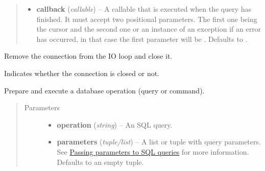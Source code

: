 \documentclass[letterpaper,10pt,english]{sphinxmanual}
\begin{document}
\begin{fulllineitems}
\begin{fulllineitems}
\begin{quote}
\begin{description}
\begin{itemize}
\item {} 
\textbf{callback} (\emph{callable}) -- A callable that is executed when the query has finished. It must accept
two positional parameters. The first one being the cursor and the second
one  or an instance of an exception if an error has occurred,
in that case the first parameter will be . Defaults to .

\end{itemize}

\end{description}\end{quote}

\end{fulllineitems}


\begin{fulllineitems}
\label{api:momoko.Connection.close}
Remove the connection from the IO loop and close it.

\end{fulllineitems}


\begin{fulllineitems}
\label{api:momoko.Connection.closed}
Indicates whether the connection is closed or not.

\end{fulllineitems}


\begin{fulllineitems}
\label{api:momoko.Connection.execute}
Prepare and execute a database operation (query or command).
\begin{quote}\begin{description}
\item[{Parameters}] \leavevmode\begin{itemize}
\item {} 
\textbf{operation} (\emph{string}) -- An SQL query.

\item {} 
\textbf{parameters} (\emph{tuple/list}) -- A list or tuple with query parameters. See \href{http://initd.org/psycopg/docs/usage.html\#query-parameters}{Passing parameters to SQL queries}
for more information. Defaults to an empty tuple.


\end{itemize}
\end{description}
\end{quote}
\end{fulllineitems}
\end{fulllineitems}
\end{document}
